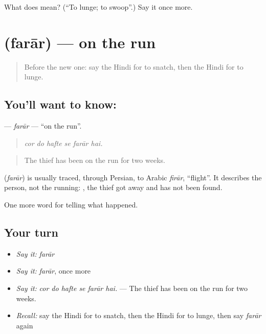 \begin{tcolorbox}[breakable,colback=teal!4,colframe=teal!35!black,title={Before you move on}]
What does  mean? (\textquotedblleft{}To lunge; to swoop\textquotedblright{}.) Say it once more.
\end{tcolorbox}
\section[\texorpdfstring{\hi{फ़रार} (farār)}{फ़रार (farār)}]{ (farār) — on the run}

\label{lesson:HI-C289-farar}



\begin{quote}
Before the new one: say the Hindi for to snatch, then the Hindi for to lunge.
\end{quote}

\subsection*{You'll want to know: }
\textbf{} — \emph{farār} — \textquotedblleft{}on the run\textquotedblright{}.

\begin{quote}
     
\end{quote}

\begin{quote}
\emph{cor do hafte se farār hai.}
\end{quote}

\begin{quote}
The thief has been on the run for two weeks.
\end{quote}

\begin{cousinweb}
\textbf{} (\emph{farār}) is usually traced, through Persian, to Arabic \emph{firār}, \textquotedblleft{}flight\textquotedblright{}. It describes the person, not the running: \textbf{  }, the thief got away and has not been found.
\end{cousinweb}

\begin{grammarlens}[title={What you've built}]
One more word for telling what happened.
\end{grammarlens}

\subsection*{Your turn}
\begin{itemize}
\raggedright
  \item \emph{Say it:} \emph{farār}
  \item \emph{Say it:} \emph{farār}, once more
  \item \emph{Say it:} \emph{cor do hafte se farār hai.} — The thief has been on the run for two weeks.
  \item \emph{Recall:} say the Hindi for to snatch, then the Hindi for to lunge, then say \emph{farār} again
\end{itemize}

